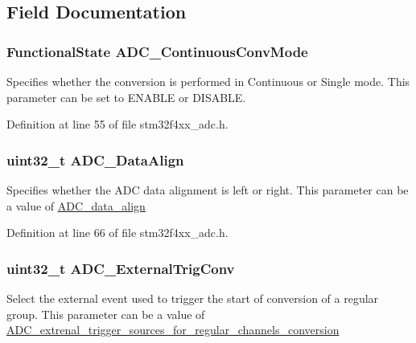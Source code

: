 \subsection{Field Documentation}
\hypertarget{struct_a_d_c___init_type_def_a3f6e0c1cc2d0e7134c1d24e3ca373074}{
\subsubsection[{A\-D\-C\-\_\-\-Continuous\-Conv\-Mode}]{\setlength{\rightskip}{0pt plus 5cm}Functional\-State A\-D\-C\-\_\-\-Continuous\-Conv\-Mode}}\label{struct_a_d_c___init_type_def_a3f6e0c1cc2d0e7134c1d24e3ca373074}
Specifies whether the conversion is performed in Continuous or Single mode. This parameter can be set to E\-N\-A\-B\-L\-E or D\-I\-S\-A\-B\-L\-E. 

Definition at line 55 of file stm32f4xx\-\_\-adc.\-h.

\hypertarget{struct_a_d_c___init_type_def_a360ec5c7f6e5e1de535ec50dfc2c7e9b}{
\subsubsection[{A\-D\-C\-\_\-\-Data\-Align}]{\setlength{\rightskip}{0pt plus 5cm}uint32\-\_\-t A\-D\-C\-\_\-\-Data\-Align}}\label{struct_a_d_c___init_type_def_a360ec5c7f6e5e1de535ec50dfc2c7e9b}
Specifies whether the A\-D\-C data alignment is left or right. This parameter can be a value of \hyperlink{group___a_d_c__data__align}{A\-D\-C\-\_\-data\-\_\-align} 

Definition at line 66 of file stm32f4xx\-\_\-adc.\-h.

\hypertarget{struct_a_d_c___init_type_def_a2a0142b756e9b3e30f858f4666f12c36}{
\subsubsection[{A\-D\-C\-\_\-\-External\-Trig\-Conv}]{\setlength{\rightskip}{0pt plus 5cm}uint32\-\_\-t A\-D\-C\-\_\-\-External\-Trig\-Conv}}\label{struct_a_d_c___init_type_def_a2a0142b756e9b3e30f858f4666f12c36}
Select the external event used to trigger the start of conversion of a regular group. This parameter can be a value of \hyperlink{group___a_d_c__extrenal__trigger__sources__for__regular__channels__conversion}{A\-D\-C\-\_\-extrenal\-\_\-trigger\-\_\-sources\-\_\-for\-\_\-regular\-\_\-channels\-\_\-conversion} 

